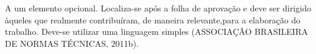 A um elemento opcional. Localiza-se após a folha de aprovação e deve ser dirigido àqueles que realmente contribuíram, de maneira relevante,para a elaboração do trabalho. Deve-se utilizar uma linguagem simples (ASSOCIAÇÃO BRASILEIRA DE NORMAS TÉCNICAS, 2011b).